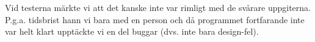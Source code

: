 Vid testerna märkte vi att det kanske inte var rimligt med de svårare uppgiterna.
P.g.a. tidsbrist hann vi bara med en person och då programmet
fortfarande inte var helt klart upptäckte vi en del buggar
(dvs. inte bara design-fel).

